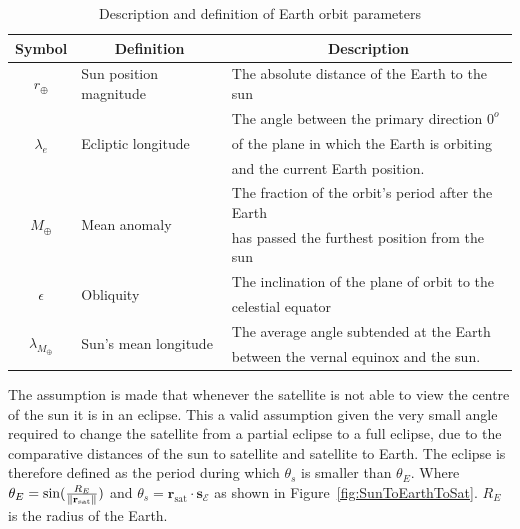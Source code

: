 \begin{table}[]
\caption{Description and definition of Earth orbit parameters}
\begin{tabular}{@{}cll@{}}
	\toprule
	\multicolumn{1}{c}{\textbf{Symbol}} &
	\multicolumn{1}{c}{\textbf{Definition}} &
	\multicolumn{1}{c}{\textbf{Description}} \\ \midrule
	\multicolumn{1}{|c|}{$r_{\oplus}$} &
	\multicolumn{1}{l|}{Sun position magnitude} &
	\multicolumn{1}{l|}{The absolute distance of the Earth to the sun} \\ \midrule
	\multicolumn{1}{|c|}{\multirow{3}{*}{$\lambda_e$}} &
	\multicolumn{1}{l|}{\multirow{3}{*}{Ecliptic longitude}} &
	\multicolumn{1}{l|}{The angle between the primary direction $0^o$} \\
	\multicolumn{1}{|c|}{} &
	\multicolumn{1}{l|}{} &
	\multicolumn{1}{l|}{of the plane in which the Earth is orbiting} \\
	\multicolumn{1}{|c|}{} &
	\multicolumn{1}{l|}{} &
	\multicolumn{1}{l|}{and the current Earth position.} \\ \midrule
	\multicolumn{1}{|c|}{\multirow{2}{*}{$M_{\oplus}$}} &
	\multicolumn{1}{l|}{\multirow{2}{*}{Mean anomaly}} &
	\multicolumn{1}{l|}{The fraction of the orbit's period after the Earth} \\
	\multicolumn{1}{|c|}{} &
	\multicolumn{1}{l|}{} &
	\multicolumn{1}{l|}{has passed the furthest position from the sun} \\ \midrule
	\multicolumn{1}{|c|}{\multirow{2}{*}{$\epsilon$}} &
	\multicolumn{1}{l|}{\multirow{2}{*}{Obliquity}} &
	\multicolumn{1}{l|}{The inclination of the plane of orbit to the} \\
	\multicolumn{1}{|c|}{} &
	\multicolumn{1}{l|}{} &
	\multicolumn{1}{l|}{celestial equator} \\ \midrule
	\multicolumn{1}{|c|}{\multirow{2}{*}{$\lambda_{M_{\oplus}}$}} &
	\multicolumn{1}{l|}{\multirow{2}{*}{Sun's mean longitude}} &
	\multicolumn{1}{l|}{The average angle subtended at the Earth} \\
	\multicolumn{1}{|c|}{} &
	\multicolumn{1}{l|}{} &
	\multicolumn{1}{l|}{between the vernal equinox and the sun. \cite{ross1916sun}} \\ \bottomrule
\end{tabular}
\label{table:SunOrbitParameters}
\end{table}

The assumption is made that whenever the satellite is not able to view the centre of the sun it is in an eclipse. This a valid assumption given the very small angle required to change the satellite from a partial eclipse to a full eclipse, due to the comparative distances of the sun to satellite and satellite to Earth. The eclipse is therefore defined as the period during which $\theta_{s}$ is smaller than $\theta_E$. Where $\theta_E = \text{sin}(\frac{R_E}{\left\lVert\mathbf{r}_{\text{sat}}\right\rVert})$ and $\theta_{s} = \mathbf{r}_{\text{sat}} \cdot \mathbf{s}_{\mathcal{E}}$ as shown in Figure~\ref{fig:SunToEarthToSat}. $R_E$ is the radius of the Earth.

